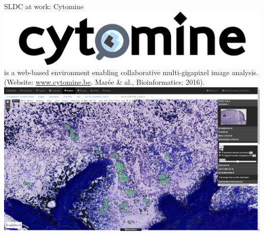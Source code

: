 \documentclass{beamer}
\begin{document}
\begin{frame}{SLDC at work: Cytomine}
	\includegraphics[scale=0.09]{images/cytomine_typo.png} is a web-based environment enabling collaborative multi-gigapixel image analysis.  \footnotesize{(Website: \url{www.cytomine.be}. Marée \& al., Bioinformatics; 2016)}.\\
	\vspace*{0.01in}
	\hspace*{-1.5in}\includegraphics[scale=0.24]{images/cytomine.png}
\end{frame}
\end{document}
